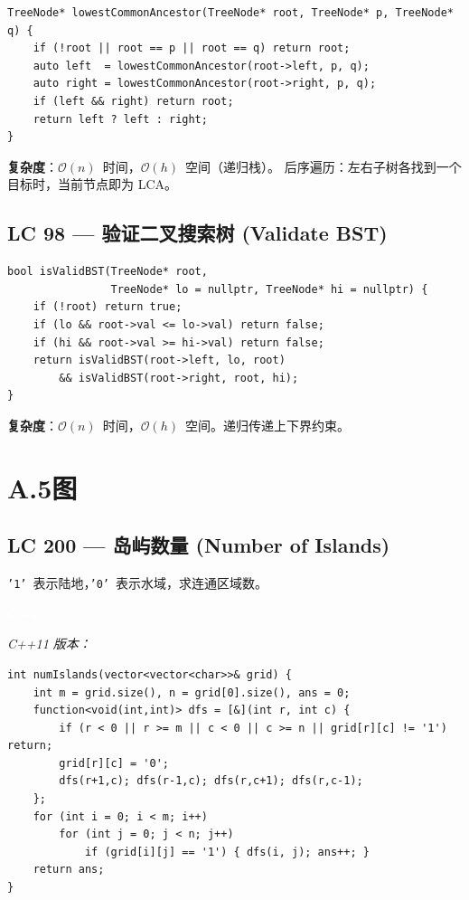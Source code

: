 \documentclass[12pt,a4paper,fontset=fandol]{ctexbook}
\newcommand{\cpplabel}{%
  \noindent\begin{tcolorbox}[sharp corners,colback=cppheadbg,colframe=cppheadbg,
    left=6pt,right=6pt,top=2pt,bottom=2pt,boxrule=0pt]
  \textcolor{white}{\small\bfseries\sffamily C++}\end{tcolorbox}%
}
\newcommand{\bigO}[1]{\mathcal{O}(#1)}
\begin{document}
\begin{lstlisting}[style=cppstyle]
TreeNode* lowestCommonAncestor(TreeNode* root, TreeNode* p, TreeNode* q) {
    if (!root || root == p || root == q) return root;
    auto left  = lowestCommonAncestor(root->left, p, q);
    auto right = lowestCommonAncestor(root->right, p, q);
    if (left && right) return root;
    return left ? left : right;
}
\end{lstlisting}
\textbf{复杂度}：$\bigO{n}$~时间，$\bigO{h}$~空间（递归栈）。
后序遍历：左右子树各找到一个目标时，当前节点即为 LCA。

\subsection*{LC 98 — 验证二叉搜索树 (Validate BST)}

\begin{lstlisting}[style=cppstyle]
bool isValidBST(TreeNode* root,
                TreeNode* lo = nullptr, TreeNode* hi = nullptr) {
    if (!root) return true;
    if (lo && root->val <= lo->val) return false;
    if (hi && root->val >= hi->val) return false;
    return isValidBST(root->left, lo, root)
        && isValidBST(root->right, root, hi);
}
\end{lstlisting}
\textbf{复杂度}：$\bigO{n}$~时间，$\bigO{h}$~空间。递归传递上下界约束。

\section*{A.5\quad 图}

\subsection*{LC 200 — 岛屿数量 (Number of Islands)}

\texttt{'1'}~表示陆地，\texttt{'0'}~表示水域，求连通区域数。

\cpplabel\noindent\textit{C++11 版本：}
\begin{lstlisting}[style=cppstyle]
int numIslands(vector<vector<char>>& grid) {
    int m = grid.size(), n = grid[0].size(), ans = 0;
    function<void(int,int)> dfs = [&](int r, int c) {
        if (r < 0 || r >= m || c < 0 || c >= n || grid[r][c] != '1') return;
        grid[r][c] = '0';
        dfs(r+1,c); dfs(r-1,c); dfs(r,c+1); dfs(r,c-1);
    };
    for (int i = 0; i < m; i++)
        for (int j = 0; j < n; j++)
            if (grid[i][j] == '1') { dfs(i, j); ans++; }
    return ans;
}
\end{lstlisting}
\end{document}

